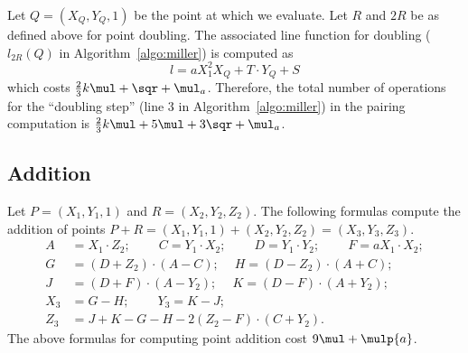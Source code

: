 Let $Q = (X_{Q}, Y_{Q}, 1)$ be the point at which we evaluate.
Let $R$ and $2R$ be as defined above for point doubling.
The associated line function for doubling
($l_{2R}(Q)$ in Algorithm~\ref{algo:miller})
is computed as
$$ l = a X_1^2 X_{Q} + T \cdot Y_{Q} + S $$
which costs
$\frac{2}{3}k\mul + \sqr + \mul_a$.
Therefore, the total number of operations for the ``doubling step''
({line 3} in Algorithm~\ref{algo:miller}) in the pairing computation is
$\frac{2}{3}k\mul + 5\mul +3\sqr + \mul_a$.


\subsection{Addition}
Let $P = (X_1,Y_1,1)$ and $R = (X_2,Y_2,Z_2)$.
The following formulas compute the addition of points
$P + R = (X_1,Y_1,1) + (X_2,Y_2,Z_2) = (X_3,Y_3,Z_3)$.
\begin{align*}
A &= X_1 \cdot Z_2;\	\qquad
C = Y_1 \cdot X_2;\	\qquad
D = Y_1 \cdot Y_2;\	\qquad
F = a X_1 \cdot X_2;\\
G &= (D + Z_2) \cdot (A - C);\	\quad
H = (D - Z_2) \cdot (A + C);\\
J &= (D + F) \cdot (A - Y_2);\	\quad
K = (D - F) \cdot (A + Y_2);\\
X_3 &= G - H;\	\qquad
Y_3 = K - J;\\
Z_3 &= J + K - G - H - 2(Z_2 - F) \cdot (C + Y_2).
\end{align*}
The above formulas for computing point addition
cost $9\mul + \mulp{a}$.

